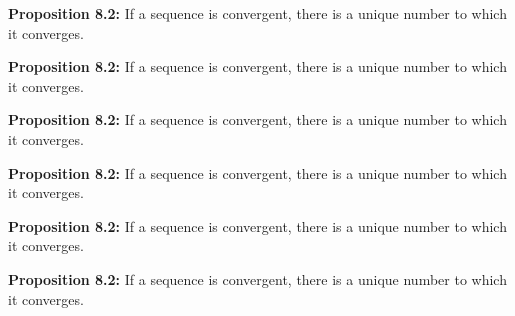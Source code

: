 \documentclass[12pt]{amsart}
\begin{document}
	
	\thispagestyle{empty}
	
\noindent \textbf{Proposition 8.2:} If a sequence is convergent, there is a unique number to which it converges.

\vfill
	
\noindent \textbf{Proposition 8.2:} If a sequence is convergent, there is a unique number to which it converges.

\vfill
	

\noindent \textbf{Proposition 8.2:} If a sequence is convergent, there is a unique number to which it converges.

\vfill
	

\noindent \textbf{Proposition 8.2:} If a sequence is convergent, there is a unique number to which it converges.

\vfill
	

\noindent \textbf{Proposition 8.2:} If a sequence is convergent, there is a unique number to which it converges.

\vfill
	

\noindent \textbf{Proposition 8.2:} If a sequence is convergent, there is a unique number to which it converges.

\vfill
	
\end{document}

